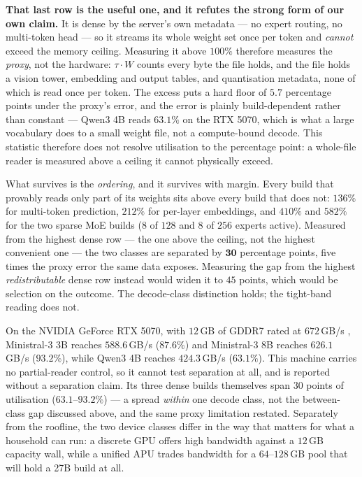 \documentclass[conference]{IEEEtran}
\begin{document}
\textbf{That last row is the useful one, and it refutes the strong form of our
own claim.} It is dense by the server's own metadata --- no expert routing, no
multi-token head --- so it streams its whole weight set once per token and
\emph{cannot} exceed the memory ceiling. Measuring it above $100\%$ therefore
measures the \emph{proxy}, not the hardware: $\tau\!\cdot\!W$ counts every byte
the file holds, and the file holds a vision tower, embedding and output tables,
and quantisation metadata, none of which is read once per token. The excess puts
a hard floor of $5.7$ percentage points under the proxy's error, and the error is
plainly build-dependent rather than constant --- Qwen3 4B reads $63.1\%$ on the
RTX 5070, which is what a large vocabulary does to a small weight file, not a
compute-bound decode. This statistic therefore does not resolve utilisation
to the percentage point: a whole-file reader is measured above a ceiling it
cannot physically exceed.

What survives is the \emph{ordering}, and it survives with margin. Every build
that provably reads only part of its weights sits above every build that does
not: $136\%$ for multi-token prediction, $212\%$ for per-layer embeddings, and
$410\%$ and $582\%$ for the two sparse MoE builds ($8$ of $128$ and $8$ of $256$
experts active). Measured from the highest dense row --- the one above the
ceiling, not the highest convenient one --- the two classes are separated by
$\mathbf{30}$ percentage points, five times the proxy error the same data
exposes. Measuring the gap from the highest \emph{redistributable} dense row
instead would widen it to $45$ points, which would be selection on the outcome.
The decode-class distinction holds; the tight-band reading does not.

On the NVIDIA GeForce RTX 5070, with $12$\,GB of GDDR7 rated at $672$\,GB/s
\cite{rtx5070spec}, Ministral-3 3B reaches $588.6$\,GB/s ($87.6\%$) and
Ministral-3 8B reaches $626.1$\,GB/s ($93.2\%$), while Qwen3 4B reaches
$424.3$\,GB/s ($63.1\%$). This machine carries no partial-reader control, so it
cannot test separation at all, and is reported without a separation claim.
Its three dense builds themselves span $30$ points of utilisation
($63.1$--$93.2\%$) --- a spread \emph{within} one decode class, not the
between-class gap discussed above, and the same proxy
limitation restated. Separately from the roofline, the two device classes differ
in the way that matters for what a household can run: a discrete GPU offers high
bandwidth against a $12$\,GB capacity wall, while a unified APU trades bandwidth
for a $64$--$128$\,GB pool that will hold a 27B build at all.
\end{document}
